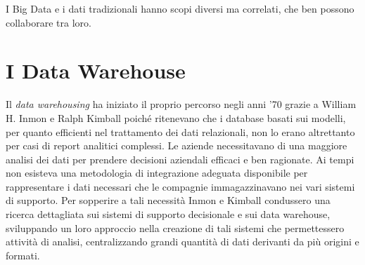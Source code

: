 I Big Data e i dati tradizionali hanno scopi diversi ma correlati, che ben possono collaborare tra loro.

\section{I Data Warehouse}

Il \textit{data warehousing} ha iniziato il proprio percorso negli anni ’70 grazie a William H. Inmon e Ralph Kimball poiché ritenevano che i database basati sui modelli, per quanto efficienti nel trattamento dei dati relazionali, non lo erano altrettanto per casi di report analitici complessi. Le aziende necessitavano di una maggiore analisi dei dati per prendere decisioni aziendali efficaci e ben ragionate. Ai tempi non esisteva una metodologia di integrazione adeguata disponibile per rappresentare i dati necessari che le compagnie immagazzinavano nei vari sistemi di supporto.\cite{researchgate_data_warehouse}
Per sopperire a tali necessità Inmon e Kimball condussero una ricerca dettagliata sui sistemi di supporto decisionale e sui data warehouse, sviluppando un loro approccio nella creazione di tali sistemi che permettessero attività di analisi, centralizzando grandi quantità di dati derivanti da più origini e formati.

